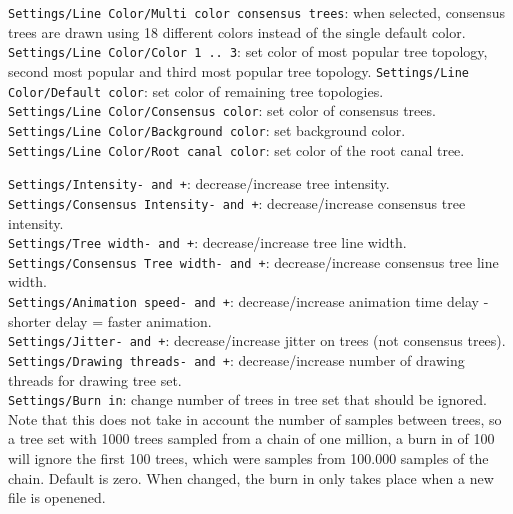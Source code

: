 \documentclass{article}
\begin{document}
\noindent
{\tt Settings/Line Color/Multi color consensus trees}: when selected, consensus trees are drawn using 18 different colors
instead of the single default color.\\
{\tt Settings/Line Color/Color 1 .. 3}: set color of most popular tree topology, second most popular and third most popular tree topology.
{\tt Settings/Line Color/Default color}: set color of remaining tree topologies.\\
{\tt Settings/Line Color/Consensus color}: set color of consensus trees.\\
{\tt Settings/Line Color/Background color}: set background color.\\
{\tt Settings/Line Color/Root canal color}: set color of the root canal tree.\\
%
\fi

\noindent
{\tt Settings/Intensity- and +}: decrease/increase tree intensity.\\
{\tt Settings/Consensus Intensity- and +}: decrease/increase consensus tree intensity.\\
{\tt Settings/Tree width- and +}: decrease/increase tree line width.\\
{\tt Settings/Consensus Tree width- and +}: decrease/increase consensus tree line width.\\
{\tt Settings/Animation speed- and +}: decrease/increase animation time delay - shorter delay = faster animation.\\
{\tt Settings/Jitter- and +}: decrease/increase jitter on trees (not consensus trees).\\
{\tt Settings/Drawing threads- and +}: decrease/increase number of drawing threads for drawing tree set.\\
{\tt Settings/Burn in}: change number of trees in tree set that should be ignored. Note that this does
not take in account the number of samples between trees, so a tree set with 1000 trees sampled from
a chain of one million, a burn in of 100 will ignore the first 100 trees, which were samples from
100.000 samples of the chain. Default is zero. When changed, the burn in only takes place when a new
file is openened.\\
\fi
\end{document}
